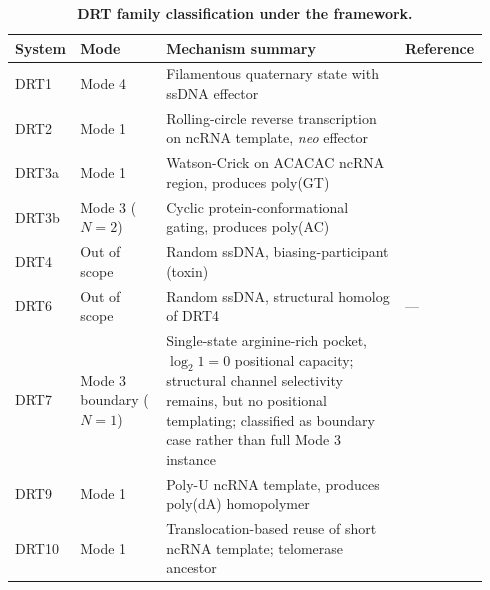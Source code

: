 \documentclass[aps,prx,reprint,amsmath,amssymb,floatfix,superscriptaddress,nofootinbib]{revtex4-2}
\theoremstyle{plain-thm}
\theoremstyle{definition-thm}
\begin{document}
\begin{table}
\caption{\textbf{DRT family classification under the framework.}}
\label{tab:drt_family}
\begin{tabular}{p{0.10\linewidth} p{0.18\linewidth} p{0.50\linewidth} p{0.16\linewidth}}
\toprule
System & Mode & Mechanism summary & Reference \\
\midrule
DRT1 & Mode 4 & Filamentous quaternary state with ssDNA effector & \citep{DRT1preprint2026} \\
DRT2 & Mode 1 & Rolling-circle reverse transcription on ncRNA template, \textit{neo} effector & \citep{Wilkinson2024, Tang2024} \\
DRT3a & Mode 1 & Watson-Crick on ACACAC ncRNA region, produces poly(GT) & \citep{Deng2026} \\
DRT3b & Mode 3 ($N=2$) & Cyclic protein-conformational gating, produces poly(AC) & \citep{Deng2026} \\
DRT4 & Out of scope & Random ssDNA, biasing-participant (toxin) & \citep{DRT4paper2025} \\
DRT6 & Out of scope & Random ssDNA, structural homolog of DRT4 & --- \\
DRT7 & Mode 3 boundary ($N=1$) & Single-state arginine-rich pocket, $\log_2 1 = 0$ positional capacity; structural channel selectivity remains, but no positional templating; classified as boundary case rather than full Mode 3 instance & \citep{DRT7preprint2026} \\
DRT9 & Mode 1 & Poly-U ncRNA template, produces poly(dA) homopolymer & \citep{Mou2025} \\
DRT10 & Mode 1 & Translocation-based reuse of short ncRNA template; telomerase ancestor & \citep{DRT10preprint2025} \\
\bottomrule
\end{tabular}
\end{table}
\end{document}
